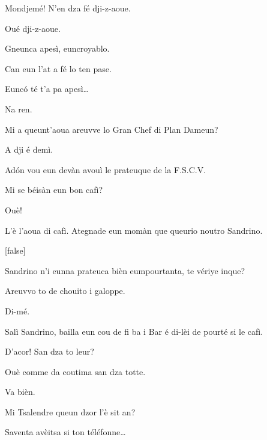 \begin{drama}


\Richardspeaks Mondjemé! N'en dza fé dji-z-aoue.

\Gerominespeaks Oué dji-z-aoue.

\Richardspeaks Gneunca apesì, euncroyablo.

\Gerominespeaks Can eun l'at a fé lo ten pase.

\Richardspeaks{} Eunc\'o té t'a pa apesì\ldots

\Spritzspeaks Na ren.

\Richardspeaks Mi a queunt’aoua areuvve lo Gran Chef di Plan Dameun?

\Saventaspeaks A dji é demì.

\Richardspeaks Ad\'on vou eun devàn avouì le prateuque de la F.S.C.V.



\Tuenospeaks Mi se béisàn eun bon cafì?

\Tcheuttespeaks Ouè!

\Tuenospeaks L'è l'aoua di cafì. Ategnade eun momàn que queurio noutro Sandrino.


[false]


\Tuenospeaks Sandrino n'i eunna prateuca bièn eumpourtanta, te vériye inque?

\Sandrinospeaks Areuvvo to de chouito i galoppe.


\Sandrinospeaks{} Di-mé.

\Tuenospeaks Salì Sandrino, bailla eun cou de fi ba i Bar é di-lèi de pourté si le cafì.

\Sandrinospeaks D'acor! San dza to leur?

\Tuenospeaks Ouè comme da coutima san dza totte.

\Sandrinospeaks Va bièn. 


\Gerominespeaks Mi Tsalendre queun dzor l'è sit an?

\Tuenospeaks Saventa avèitsa si ton téléfonne\ldots


\end{drama}
